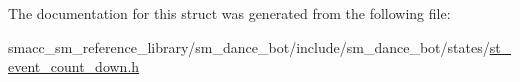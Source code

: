 The documentation for this struct was generated from the following file\+:\begin{DoxyCompactItemize}
\item 
smacc\+\_\+sm\+\_\+reference\+\_\+library/sm\+\_\+dance\+\_\+bot/include/sm\+\_\+dance\+\_\+bot/states/\hyperlink{sm__dance__bot_2include_2sm__dance__bot_2states_2st__event__count__down_8h}{st\+\_\+event\+\_\+count\+\_\+down.\+h}\end{DoxyCompactItemize}
